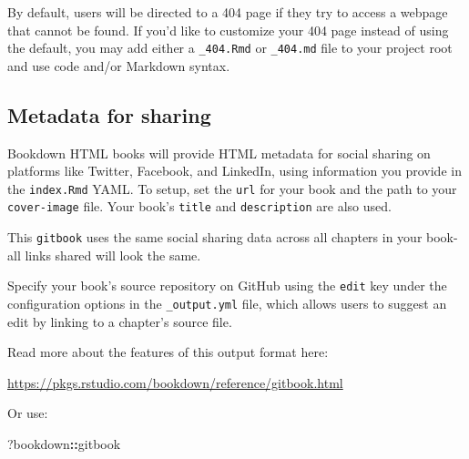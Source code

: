 \documentclass[
  spanish,
]{article}
\newenvironment{Shaded}{\begin{snugshade}}{\end{snugshade}}
\newcommand{\NormalTok}[1]{#1}
\newcommand{\SpecialCharTok}[1]{\textcolor[rgb]{0.81,0.36,0.00}{\textbf{#1}}}
\begin{document}
By default, users will be directed to a 404 page if they try to access a webpage that cannot be found. If you'd like to customize your 404 page instead of using the default, you may add either a \texttt{\_404.Rmd} or \texttt{\_404.md} file to your project root and use code and/or Markdown syntax.

\subsection{Metadata for sharing}\label{metadata-for-sharing}

Bookdown HTML books will provide HTML metadata for social sharing on platforms like Twitter, Facebook, and LinkedIn, using information you provide in the \texttt{index.Rmd} YAML. To setup, set the \texttt{url} for your book and the path to your \texttt{cover-image} file. Your book's \texttt{title} and \texttt{description} are also used.

This \texttt{gitbook} uses the same social sharing data across all chapters in your book- all links shared will look the same.

Specify your book's source repository on GitHub using the \texttt{edit} key under the configuration options in the \texttt{\_output.yml} file, which allows users to suggest an edit by linking to a chapter's source file.

Read more about the features of this output format here:

\url{https://pkgs.rstudio.com/bookdown/reference/gitbook.html}

Or use:

\begin{Shaded}
\begin{Highlighting}[]
\NormalTok{?bookdown}\SpecialCharTok{::}\NormalTok{gitbook}
\end{Highlighting}
\end{Shaded}
\end{document}
